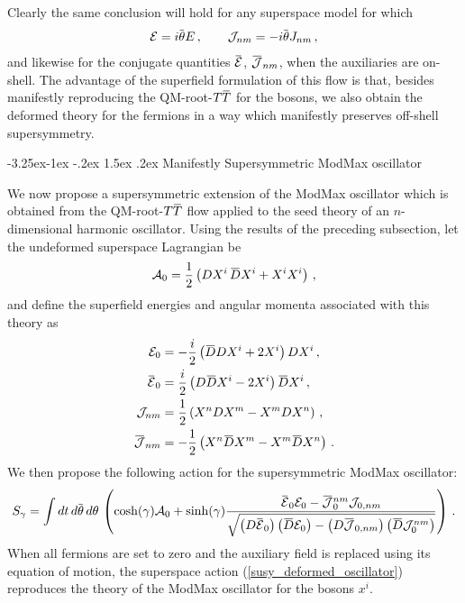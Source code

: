 \documentclass[12pt]{article}
\makeatletter
\numberwithin{equation}{section}
\renewcommand\subsection{\@startsection{subsection}{2}{\z@}%
                                     {-3.25ex\@plus -1ex \@minus -.2ex}%
                                     {1.5ex \@plus .2ex}%
                                     {\normalfont\bfseries}}
\newcommand{\overbar}[1]{\mkern 1.5mu\overline{\mkern-1.5mu#1\mkern-1.5mu}\mkern 1.5mu}
\newcommand{\Dbar}{\overbar{D}}
\newcommand{\thetab}{\overbar{\theta}}
\def\TT{{T\overbar{T}}}
\def\cEb{{\overbar{\mathcal{E}}}}
\def\cE{{\mathcal{E}}}
\makeatother
\begin{document}
Clearly the same conclusion will hold for any superspace model for which
%
\begin{align}
    \mathcal{E} = i \thetab E \, , \qquad \mathcal{J}_{nm} = - i \thetab J_{nm} \, , 
\end{align}
%
and likewise for the conjugate quantities $\cEb$, $\overbar{\mathcal{J}}_{nm}$, when the auxiliaries are on-shell. The advantage of the superfield formulation of this flow is that, besides manifestly reproducing the QM-root-$\TT$ for the bosons, we also obtain the deformed theory for the fermions in a way which manifestly preserves off-shell supersymmetry.

\subsection{Manifestly Supersymmetric ModMax oscillator}

We now propose a supersymmetric extension of the ModMax oscillator which is obtained from the QM-root-$\TT$ flow applied to the seed theory of an $n$-dimensional harmonic oscillator. Using the results of the preceding subsection, let the undeformed superspace Lagrangian be
%
\begin{align}
    \mathcal{A}_0 = \frac{1}{2} \left( D X^i \, \Dbar X^i + X^i X^i \right) \, , 
\end{align}
%
and define the superfield energies and angular momenta associated with this theory as
%
\begin{align}
    \cE_0 &= - \frac{i}{2} \left( \Dbar D X^i + 2 X^i \right) D X^i  \, , \nonumber \\
    \cEb_0 &= \frac{i}{2} \left( D \Dbar X^i - 2 X^i \right) \Dbar X^i \, , \nonumber \\
    \mathcal{J}_{nm} &= \frac{1}{2} \left( X^n D X^m - X^m D X^n \right) \, , \nonumber \\
    \overbar{\mathcal{J}}_{nm} &= - \frac{1}{2} \left( X^n \Dbar X^m - X^m \Dbar X^n \right) \, .
\end{align}
%
We then propose the following action for the supersymmetric ModMax oscillator:
%
\begin{align}\label{susy_deformed_oscillator}
    S_\gamma = \int dt \, d \thetab \, d \theta \, \left( \cosh ( \gamma ) \mathcal{A}_0 + \sinh ( \gamma ) \frac{\cEb_0  \cE_0 - \overbar{\mathcal{J}}^{nm}_0 \mathcal{J}_{0, nm}}{ \sqrt{ \left( D \cEb_0 \right) \left( \Dbar \cE_0 \right) - \left( D \overbar{\mathcal{J}}_{0,nm} \right) \left( \Dbar \mathcal{J}^{nm}_0 \right) } } \right) \, .
\end{align}
%
When all fermions are set to zero and the auxiliary field is replaced using its equation of motion, the superspace action (\ref{susy_deformed_oscillator}) reproduces the theory of the ModMax oscillator for the bosons $x^i$.
\end{document}
